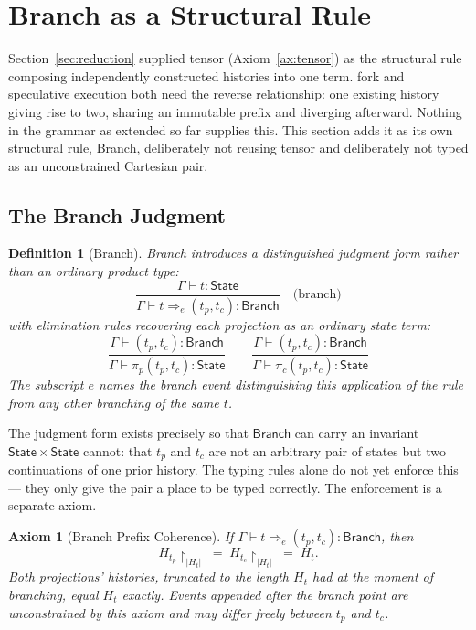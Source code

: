 \documentclass[11pt]{article}
\newtheorem{definition}{Definition}[section]
\newtheorem{axiom}{Axiom}[section]
\begin{document}
\section{Branch as a Structural Rule}
\label{sec:branch}

Section~\ref{sec:reduction} supplied tensor (Axiom~\ref{ax:tensor}) as the structural rule composing independently constructed histories into one term. fork and speculative execution both need the reverse relationship: one existing history giving rise to two, sharing an immutable prefix and diverging afterward. Nothing in the grammar as extended so far supplies this. This section adds it as its own structural rule, Branch, deliberately not reusing tensor and deliberately not typed as an unconstrained Cartesian pair.

\subsection{The Branch Judgment}

\begin{definition}[Branch]
\label{def:branch-judgment}
Branch introduces a distinguished judgment form rather than an ordinary product type:
\[
\dfrac{\Gamma \vdash t : \mathsf{State}}
{\Gamma \vdash t \Longrightarrow_e (t_p, t_c) : \mathsf{Branch}}
\quad \text{(branch)}
\]
with elimination rules recovering each projection as an ordinary state term:
\[
\dfrac{\Gamma \vdash (t_p,t_c) : \mathsf{Branch}}{\Gamma \vdash \pi_p(t_p,t_c) : \mathsf{State}}
\qquad
\dfrac{\Gamma \vdash (t_p,t_c) : \mathsf{Branch}}{\Gamma \vdash \pi_c(t_p,t_c) : \mathsf{State}}
\]
The subscript $e$ names the branch event distinguishing this application of the rule from any other branching of the same $t$.
\end{definition}

The judgment form exists precisely so that $\mathsf{Branch}$ can carry an invariant $\mathsf{State}\times\mathsf{State}$ cannot: that $t_p$ and $t_c$ are not an arbitrary pair of states but two continuations of one prior history. The typing rules alone do not yet enforce this --- they only give the pair a place to be typed correctly. The enforcement is a separate axiom.

\begin{axiom}[Branch Prefix Coherence]
\label{ax:branch-coherence}
If $\Gamma \vdash t \Longrightarrow_e (t_p,t_c) : \mathsf{Branch}$, then
\[
H_{t_p}\!\restriction_{|H_t|} \;=\; H_{t_c}\!\restriction_{|H_t|} \;=\; H_t.
\]
Both projections' histories, truncated to the length $H_t$ had at the moment of branching, equal $H_t$ exactly. Events appended after the branch point are unconstrained by this axiom and may differ freely between $t_p$ and $t_c$.
\end{axiom}
\end{document}
